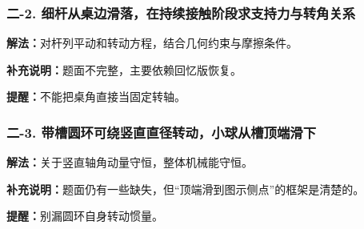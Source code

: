 \documentclass[12pt,a4paper]{ctexart}
\begin{document}
\subsubsection*{二-2. 细杆从桌边滑落，在持续接触阶段求支持力与转角关系}
\begin{tcolorbox}[colback=gray!2!white,colframe=black!60,title={题目}]

\end{tcolorbox}
\begin{tcolorbox}[colback=blue!2!white,colframe=blue!55!black,title={完整答案}]
\textbf{解法：}对杆列平动和转动方程，结合几何约束与摩擦条件。\par

\textbf{补充说明：}题面不完整，主要依赖回忆版恢复。\par
\end{tcolorbox}
\begin{tcolorbox}[colback=red!2!white,colframe=red!55!black,title={易错点}]
\textbf{提醒：}不能把桌角直接当固定转轴。\par
\end{tcolorbox}

\subsubsection*{二-3. 带槽圆环可绕竖直直径转动，小球从槽顶端滑下}
\begin{tcolorbox}[colback=gray!2!white,colframe=black!60,title={题目}]

\end{tcolorbox}
\begin{tcolorbox}[colback=blue!2!white,colframe=blue!55!black,title={完整答案}]
\textbf{解法：}关于竖直轴角动量守恒，整体机械能守恒。\par

\textbf{补充说明：}题面仍有一些缺失，但“顶端滑到图示侧点”的框架是清楚的。\par
\end{tcolorbox}
\begin{tcolorbox}[colback=red!2!white,colframe=red!55!black,title={易错点}]
\textbf{提醒：}别漏圆环自身转动惯量。\par
\end{tcolorbox}
\end{document}
